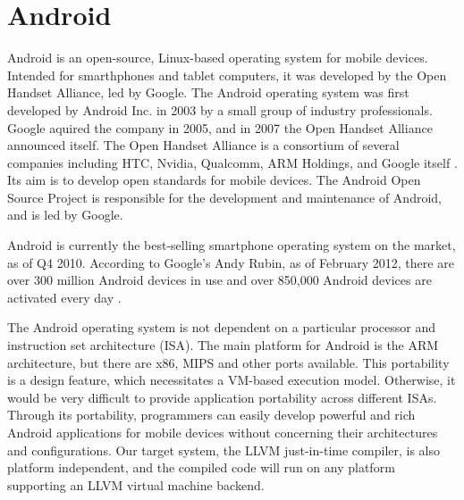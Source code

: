 \section{Android}
\label{sec:android}

Android is an open-source, Linux-based operating system for mobile devices. Intended for smarthphones and tablet computers, it was developed by the Open Handset Alliance, led by Google. The Android operating system was first developed by Android Inc. in 2003 by a small group of industry professionals. Google aquired the company in 2005, and in 2007 the Open Handset Alliance announced itself. The Open Handset Alliance is a consortium of several companies including HTC, Nvidia, Qualcomm, ARM Holdings, and Google itself \cite{oha_members}. Its aim is to develop open standards for mobile devices. The Android Open Source Project is responsible for the development and maintenance of Android, and is led by Google.

Android is currently the best-selling smartphone operating system on the market, as of Q4 2010\cite{android_top}. According to Google's Andy Rubin, as of February 2012, there are over 300 million Android devices in use and over 850,000 Android devices are activated every day \cite{android_sold}.

The Android operating system is not dependent on a particular processor and instruction set architecture (ISA). The main platform for Android is the ARM architecture, but there are x86, MIPS and other ports available. This portability is a design feature, which necessitates a VM-based execution model. Otherwise, it would be very difficult to provide application portability across different ISAs. Through its portability, programmers can easily develop powerful and rich Android applications for mobile devices without concerning their architectures and conﬁgurations. Our target system, the LLVM just-in-time compiler, is also platform independent, and the compiled code will run on any platform supporting an LLVM virtual machine backend.
